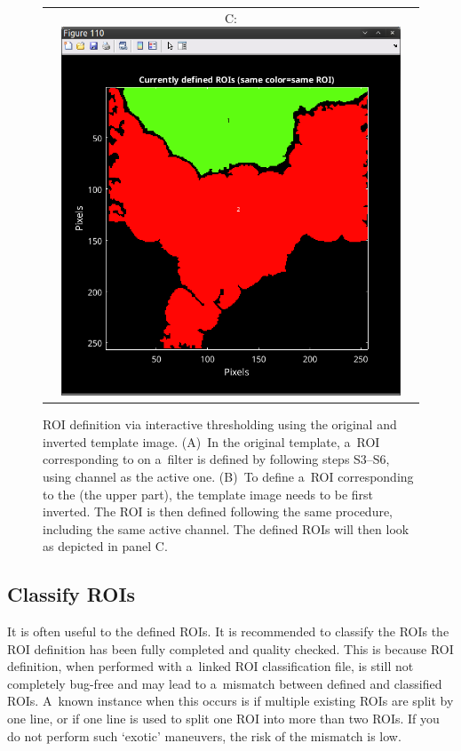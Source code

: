 \begin{figure}[!ht]
\begin{tabular}{ccc}
&
C: \includegraphics[scale=0.19]{figs3/LANS-roi-interactive8}
\end{tabular}
\caption{\label{fig:interactive-invert}%
ROI definition via interactive thresholding using the original and inverted template image. (A)~In the original template, a~ROI corresponding to  on a~filter is defined by following steps S3--S6, using  channel as the active one. (B)~To define a~ROI corresponding to the  (the upper part), the template image needs to be first inverted. The ROI is then defined following the same procedure, including the same active channel. The defined ROIs will then look as depicted in panel C.}
\end{figure}


\subsection{Classify ROIs}
\label{sec:classifyROIs}

\goldbox{}
It is often useful to  the defined ROIs. It is recommended to classify the ROIs  the ROI definition has been fully completed and quality checked. This is because ROI definition, when performed with a~linked ROI classification file, is still not completely bug-free and may lead to a~mismatch between defined and classified ROIs. A~known instance when this occurs is if multiple existing ROIs are split by one line, or if one line is used to split one ROI into more than two ROIs. If you do not perform such `exotic' maneuvers, the risk of the mismatch is low.
\tcbe


